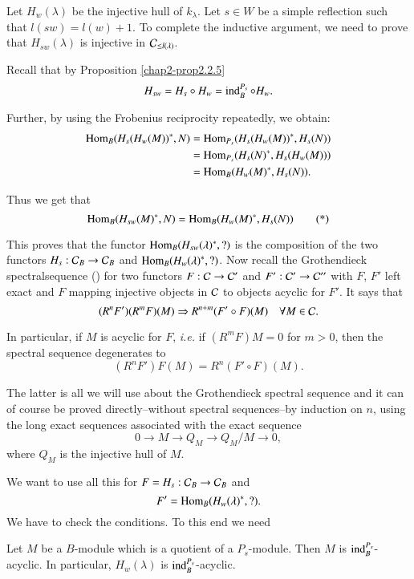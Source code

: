 Let $H_{w}(\lambda)$ be the injective hull of $k_{\lambda}$. Let $s\in
W$ be a simple reflection such that $l(sw)=l(w)+1$. To complete the
inductive argument, we need to prove that $H_{sw}(\lambda)$ is
injective in $\mathcal{C}_{\leq l(\lambda)}$.

Recall that by Proposition \ref{chap2-prop2.2.5}
$$
H_{sw}=H_{s}\circ H_{w}=\operatorname{ind}^{P_{s}}_{B}\circ H_{w}.
$$

Further, by using the Frobenius reciprocity repeatedly, we obtain:
\begin{align*}
\operatorname{Hom}_{B}(H_{s}(H_{w}(M))^{*},N) &=
\operatorname{Hom}_{P_{s}}(H_{s}(H_{w}(M))^{*},H_{s}(N))\\
&= \operatorname{Hom}_{P_{s}}(H_{s}(N)^{*},H_{s}(H_{w}(M)))\\
&= \operatorname{Hom}_{B}(H_{w}(M)^{*},H_{s}(N)).
\end{align*}

Thus we get that
\begin{equation*}
\operatorname{Hom}_{B}(H_{sw}(M)^{*},N)=\operatorname{Hom}_{B}(H_{w}(M)^{*},H_{s}(N))\tag{*}
\end{equation*}

This proves that the functor $\operatorname{Hom}_{B}(H_{sw}(\lambda)^{*},?)$ is the
composition of the two functors $H_{s}:\mathcal{C}_{B}\to \mathcal{C}_{B}$ and
$\operatorname{Hom}_{B}(H_{w}(\lambda)^{*},?)$. Now recall the Grothendieck
spectral\pageoriginale sequence\label{page26} (\cite{key11}) 
for two functors
$F:\mathcal{C}\to \mathcal{C}'$ and $F':\mathcal{C}'\to \mathcal{C}''$ with $F$, $F'$ left exact and $F$
mapping injective objects in $\mathcal{C}$ to objects acyclic for $F'$. It says
that
$$
(R^{n}F')(R^{m}F)(M)\Rightarrow R^{n+m}(F'\circ F)(M)\quad \forall M\in
\mathcal{C}.
$$

In particular, if $M$ is acyclic for $F$, {\em i.e.} if $(R^{m}F)M=0$
for $m>0$, then the spectral sequence degenerates to
$$
(R^{n}F')F(M)=R^{n}(F'\circ F)(M).
$$

The latter is all we will use about the Grothendieck spectral 
sequence
and it can of course be proved directly--without spectral
sequen\-ces--by induction on $n$, using the long exact sequences
associated with the exact sequence
$$
0\to M\to Q_{M}\to Q_{M}/M\to 0,
$$
where $Q_{M}$ is the injective hull of $M$.

We want to use all this for $F=H_{s}:\mathcal{C}_{B}\to \mathcal{C}_{B}$ and
$$
F'=\operatorname{Hom}_{B}(H_{w}(\lambda)^{*},?).
$$ 
We have to check the
conditions. To this end we need

\begin{lemma}\label{chap3-lem3.1.11}
Let $M$ be a $B$-module which is a quotient of a $P_{s}$-module. Then
$M$ is $\operatorname{ind}^{P_{s}}_{B}$-acyclic. In particular, $H_{w}(\lambda)$ is $\operatorname{ind}^{P_{s}}_{B}$-acyclic.
\end{lemma}

